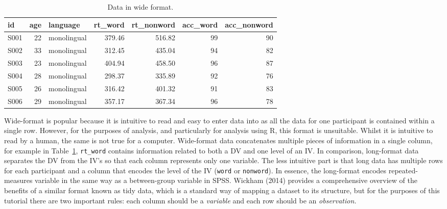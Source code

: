 \documentclass[
  english,
  doc,floatsintext]{apa6}
\begin{document}
\begin{table}

\caption{\label{tab:wide-data}Data in wide format.}
\centering
\begin{tabular}[t]{l|r|l|r|r|r|r}
\hline
id & age & language & rt\_word & rt\_nonword & acc\_word & acc\_nonword\\
\hline
S001 & 22 & monolingual & 379.46 & 516.82 & 99 & 90\\
\hline
S002 & 33 & monolingual & 312.45 & 435.04 & 94 & 82\\
\hline
S003 & 23 & monolingual & 404.94 & 458.50 & 96 & 87\\
\hline
S004 & 28 & monolingual & 298.37 & 335.89 & 92 & 76\\
\hline
S005 & 26 & monolingual & 316.42 & 401.32 & 91 & 83\\
\hline
S006 & 29 & monolingual & 357.17 & 367.34 & 96 & 78\\
\hline
\end{tabular}
\end{table}

Wide-format is popular because it is intuitive to read and easy to enter data into as all the data for one participant is contained within a single row. However, for the purposes of analysis, and particularly for analysis using R, this format is unsuitable. Whilst it is intuitive to read by a human, the same is not true for a computer. Wide-format data concatenates multiple pieces of information in a single column, for example in Table~\ref{tab:wide-data}, \texttt{rt\_word} contains information related to both a DV and one level of an IV. In comparison, long-format data separates the DV from the IV's so that each column represents only one variable. The less intuitive part is that long data has multiple rows for each participant and a column that encodes the level of the IV (\texttt{word} or \texttt{nonword}). In essence, the long-format encodes repeated-measures variable in the same way as a between-group variable in SPSS. Wickham (2014) provides a comprehensive overview of the benefits of a similar format known as tidy data, which is a standard way of mapping a dataset to its structure, but for the purposes of this tutorial there are two important rules: each column should be a \emph{variable} and each row should be an \emph{observation.}
\end{document}
